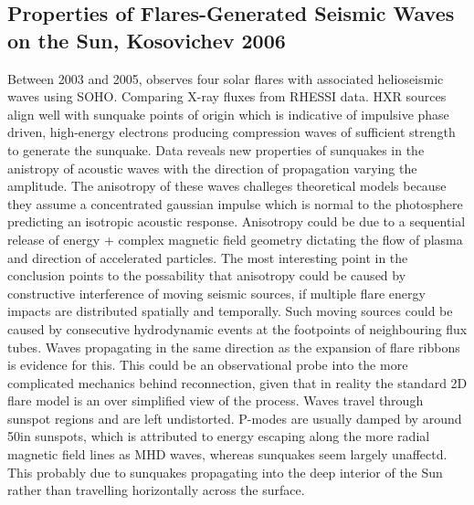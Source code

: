 \subsection{Properties of Flares-Generated Seismic Waves on the Sun, Kosovichev 2006}
Between 2003 and 2005, \cite{2006SoPh..238....1K} observes four solar flares with associated helioseismic waves using SOHO. Comparing X-ray fluxes from RHESSI data. HXR sources align well with sunquake points of origin which is indicative of impulsive phase driven, high-energy electrons producing compression waves of sufficient strength to generate the sunquake. Data reveals new properties of sunquakes in the anistropy of acoustic waves with the direction of propagation varying the amplitude. The anisotropy of these waves challeges theoretical models \citep{2000AcA....50..405M,2003SoPh..218..227P, 2005SoPh..232....1P} because they assume a concentrated gaussian impulse which is normal to the photosphere predicting an isotropic acoustic response. Anisotropy could be due to a sequential release of energy + complex magnetic field geometry dictating the flow of plasma and direction of accelerated particles. The most interesting point in the conclusion points to the possability that anisotropy could be caused by constructive interference of moving seismic sources, if multiple flare energy impacts are distributed spatially and temporally. Such moving sources could be caused by consecutive hydrodynamic events at the footpoints of neighbouring flux tubes. Waves propagating in the same direction as the expansion of flare ribbons is evidence for this. This could be an observational probe into the more complicated mechanics behind reconnection, given that in reality the standard 2D flare model is an over simplified view of the process.      
Waves travel through sunspot regions and are left undistorted. P-modes are usually damped by around 50\percent in sunspots, which is attributed to energy escaping along the more radial magnetic field lines as MHD waves, whereas sunquakes seem largely unaffectd. This probably due to sunquakes propagating into the deep interior of the Sun rather than travelling horizontally across the surface.

